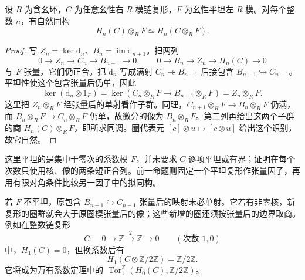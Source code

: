 \begin{proposition}\label{b4:prop:flat-coefficients-homology}
	设 \(R\) 为含幺环，\(C\) 为任意幺性右 \(R\) 模链复形，\(F\) 为幺性平坦左 \(R\) 模。对每个整数 \(n\)，有自然同构
	\[
		H_n(C)\otimes_R F\simeq H_n(C\otimes_R F).
	\]
\end{proposition}
\begin{proof}
	写 \(Z_n=\ker \mathrm{d}_n\)、\(B_n=\operatorname{im}\mathrm{d}_{n+1}\)。把两列
	\[
		0\longrightarrow Z_n\longrightarrow C_n\longrightarrow B_{n-1}\longrightarrow0, \qquad 0\longrightarrow B_n\longrightarrow Z_n\longrightarrow H_n(C)\longrightarrow0
	\]
	与 \(F\) 张量，它们仍正合。把 \(\mathrm{d}_n\) 写成满射 \(C_n\twoheadrightarrow B_{n-1}\) 后接包含 \(B_{n-1}\hookrightarrow C_{n-1}\)。平坦性使这个包含张量后仍单，因此
	\[
		\ker(\mathrm{d}_n\otimes1_F) =\ker(C_n\otimes_RF\longrightarrow B_{n-1}\otimes_RF) =Z_n\otimes_RF.
	\]
	这里把 \(Z_n\otimes_RF\) 经张量后的单射看作子群。同理，\(C_{n+1}\otimes_RF\to B_n\otimes_RF\) 仍满，而 \(B_n\otimes_RF\to C_n\otimes_RF\) 仍单，故微分的像为 \(B_n\otimes_RF\)。第二列再给出这两个子群的商 \(H_n(C)\otimes_RF\)，即所求同调。圈代表元 \([c]\otimes u\mapsto[c\otimes u]\) 给出这个识别，故它自然。
\end{proof}

这里平坦的是集中于零次的系数模 \(F\)，并未要求 \(C\) 逐项平坦或有界；证明在每个次数只使用核、像的两条短正合列。前一命题则固定一个平坦复形作张量因子，再用有限对角条件比较另一因子中的拟同构。

\ProseParagraphBreak
若 \(F\) 不平坦，原包含 \(B_{n-1}\hookrightarrow C_{n-1}\) 张量后的映射未必单射。它若有非零核，新复形的圈群就会大于原圈模张量后的像；这些新增的圈还须按张量后的边界取商。例如在整数链复形
\[
	C:\quad 0\longrightarrow\mathbb Z\xrightarrow{\,2\,}\mathbb Z\longrightarrow0 \qquad(\text{次数 }1,0)
\]
中，\(H_1(C)=0\)，但换系数后有
\[
	H_1(C\otimes\mathbb Z/2\mathbb Z)=\mathbb Z/2\mathbb Z.
\]
它将成为万有系数定理中的 \(\operatorname{Tor}_1^{\mathbb Z}(H_0(C),\mathbb Z/2\mathbb Z)\)。
